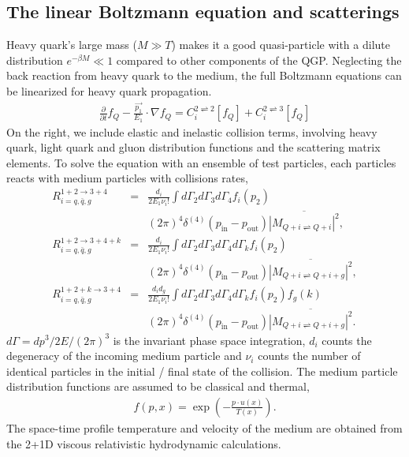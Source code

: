 \documentclass[aps, prc, reprint, amsmath, groupedaddress, nofootinbib]{revtex4-1}
\begin{document}
\subsection{The linear Boltzmann equation and scatterings}
Heavy quark's large mass ($M \gg T$) makes it a good quasi-particle with a dilute distribution $e^{-\beta M} \ll 1$ compared to other components of the QGP.
Neglecting the back reaction from heavy quark to the medium, the full Boltzmann equations can be linearized for heavy quark propagation.
\begin{eqnarray}
  \frac{\partial}{\partial t}f_Q - \frac{\vec{p_1}}{E_1}\cdot\nabla f_Q  = C_i^{2\rightleftharpoons 2}[f_Q] + C_i^{2\rightleftharpoons 3}[f_Q]
\end{eqnarray}
On the right, we include elastic and inelastic collision terms, involving heavy quark, light quark and gluon distribution functions and the scattering matrix elements.
To solve the equation with an ensemble of test particles, each particles reacts with medium particles with collisions rates,
\begin{eqnarray}
    R_{i=q,\bar{q},g}^{1+2 \rightarrow 3+4} &=& \frac{d_i}{2E_1\nu_i !} \int d \Gamma_2 d \Gamma_3 d \Gamma_4 f_i(p_2) 
   \nonumber
  \\&& {(2\pi)}^4\delta^{(4)}(p_{\textrm{in}} - p_{\textrm{out}})  \overline{|M_{Q+i \rightleftharpoons Q+i}|^2},
   \nonumber
  \\
  R_{i=q,\bar{q},g}^{1+2 \rightarrow 3+4+k} &=& \frac{d_i}{2E_1\nu_i !} \int d \Gamma_2 d \Gamma_3 d \Gamma_4 d \Gamma_k f_i(p_2) 
   \nonumber
  \\&& {(2\pi)}^4\delta^{(4)}(p_{\textrm{in}} - p_{\textrm{out}})\overline{|M_{Q+i \rightleftharpoons Q+i+g}|^2},
  	 \nonumber
  \\
  R_{i=q,\bar{q},g}^{1+2+k \rightarrow 3+4} &=& \frac{d_i d_g}{2E_1\nu_i !} \int d \Gamma_2 d \Gamma_3 d \Gamma_4 d \Gamma_k f_i(p_2)f_g(k)
   \nonumber
  \\&& {(2\pi)}^4\delta^{(4)}(p_{\textrm{in}} - p_{\textrm{out}})\overline{|M_{Q+i \rightleftharpoons Q+i+g}|^2}.
  	 \nonumber
\end{eqnarray}
$d\Gamma = dp^3/2E/(2\pi)^3$ is the invariant phase space integration, $d_i$ counts the degeneracy of the incoming medium particle and $\nu_i$ counts the number of identical particles in the initial / final state of the collision.
The medium particle distribution functions are assumed to be classical and thermal, 
\begin{eqnarray}
f(p,x) = \exp\left(-\frac{p \cdot u(x)}{T(x)}\right).
\end{eqnarray}
The space-time profile temperature and velocity of the medium are obtained from the 2+1D viscous relativistic hydrodynamic calculations.
\end{document}
